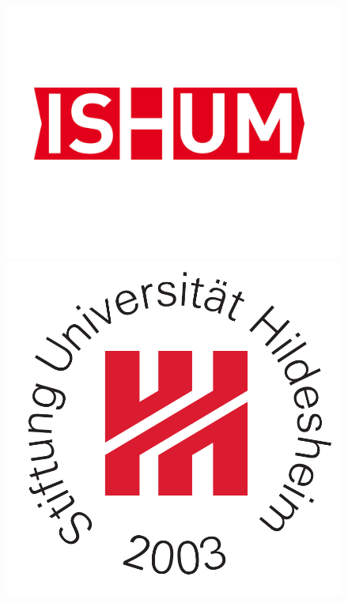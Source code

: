 \begin{titlepage}
\begin{figure}
    \begin{minipage}{0.2\textwidth}
        \begin{flushleft}    
            \includegraphics[scale=0.25]{csm_ISUM_Logo_Final_107dd2fa79.jpg}
        \end{flushleft}
    \end{minipage}  
    \begin{minipage}{0.55\textwidth}
        \centering
        \hspace{0.25cm}
    \end{minipage}
    \begin{minipage}{0.2\textwidth}
        \begin{flushleft}   
            \includegraphics[scale=0.25]{St_Uni-Logo-9-2003-eps-converted-to.pdf}

\end{flushleft}
\end{minipage}
\end{figure}
\end{titlepage}
